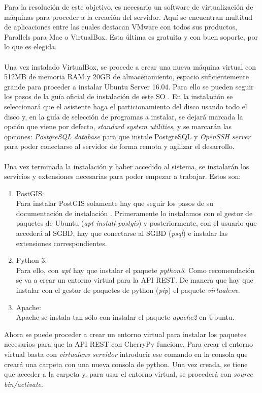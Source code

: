 Para la resolución de este objetivo, es necesario un software de virtualización de máquinas para proceder a la creación del servidor. Aquí se encuentran multitud de aplicaciones entre las cuales destacan VMware con todos sus productos, Parallels para Mac o VirtualBox. Esta última es gratuita y con buen soporte, por lo que es elegida.
\\\\
Una vez instalado VirtualBox, se procede a crear una nueva máquina virtual con 512MB de memoria RAM y 20GB de almacenamiento, espacio suficientemente grande para proceder a instalar Ubuntu Server 16.04. Para ello se pueden seguir los pasos de la guía oficial de instalación de este SO \cite{instalacion-ubuntu-server}. En la instalación se seleccionará que el asistente haga el particionamiento del disco usando todo el disco y, en la guía de selección de programas a instalar, se dejará marcada la opción que viene por defecto, \textit{standard system utilities}, y se marcarán las opciones: \textit{PostgreSQL database} para que instale PostgreSQL y \textit{OpenSSH server} para poder conectarse al servidor de forma remota y agilizar el desarrollo.
\\\\
Una vez terminada la instalación y haber accedido al sistema, se instalarán los servicios y extensiones necesarias para poder empezar a trabajar. Estos son:
\begin{enumerate}
	\item PostGIS:\\
	Para instalar PostGIS solamente hay que seguir los pasos de su documentación de instalación \cite{instalacion-postgis}. Primeramente lo instalamos con el gestor de paquetes de Ubuntu (\textit{apt install postgis}) y posteriormente, con el usuario que accederá al SGBD, hay que conectarse al SGBD (\textit{psql}) e instalar las extensiones correspondientes.
	\item Python 3:\\
	Para ello, con \textit{apt} hay que instalar el paquete \textit{python3}. Como recomendación se va a crear un entorno virtual para la API REST. De manera que hay que instalar con el gestor de paquetes de python (\textit{pip}) el paquete \textit{virtualenv}.
	\item Apache:\\
	Apache se instala tan sólo con instalar el paquete \textit{apache2} en Ubuntu. 
\end{enumerate}
Ahora se puede proceder a crear un entorno virtual para instalar los paquetes necesarios para que la API REST con CherryPy funcione. Para crear el entorno virtual basta con \textit{virtualenv servidor} introducir ese comando en la consola que creará una carpeta con una nueva consola de python. Una vez creada, se tiene que acceder a la carpeta y, para usar el entorno virtual, se procederá con \textit{source bin/activate}.
